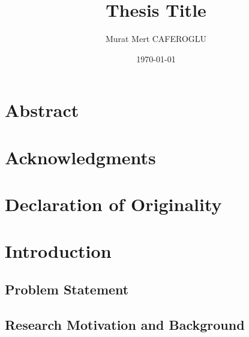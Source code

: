 \documentclass[12pt, a4paper]{report}
\title{Thesis Title}
\author{Murat Mert CAFEROGLU}
\date{\today}
\begin{document}

 

\newpage
{} %

\chapter*{Abstract}


\chapter*{Acknowledgments}


\chapter*{Declaration of Originality}


\tableofcontents
\listoffigures
\listoftables
\newpage


\newpage
\chapter{Introduction}
\label{chap:Introduction}


\section{Problem Statement}


\section{Research Motivation and Background}

\end{document}
